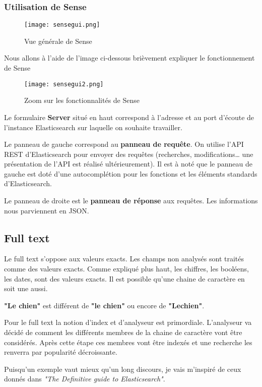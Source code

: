 \subsubsection{Utilisation de Sense}

\begin{figure}[H]
\center
\texttt{[image: sensegui.png]}
\label{fig:sensegui}
\caption{Vue générale de Sense}
\end{figure}

Nous allons à l'aide de l'image ci-dessous brièvement expliquer le fonctionnement de Sense
\begin{figure}[H]
\center
\texttt{[image: sensegui2.png]}
\label{fig:sensegui2.png}
\caption{Zoom sur les fonctionnalités de Sense}
\end{figure}
Le formulaire \textbf{Server} situé en haut correspond à l'adresse et au port d'écoute 
de l'instance Elasticsearch sur laquelle on souhaite travailler.

Le panneau de gauche correspond au \textbf{panneau de requête}. On utilise l'API 
REST d'Elasticsearch pour envoyer des requêtes (recherches, modifications\ldots 
une présentation de l'API est réalisé ultérieurement). Il est à noté que le panneau 
de gauche est doté d'une autocomplétion pour les fonctions et les éléments standards 
d'Elasticsearch.

Le panneau de droite est le \textbf{panneau de réponse} aux requêtes. Les informations
nous parviennent en JSON.

\subsection{Full text}
\label{subsec:elasticfulltext}
Le full text s'oppose aux valeurs exacts.
Les champs non analysés sont traités comme des valeurs exacts.
Comme expliqué plus haut, les chiffres, les booléens, les dates, sont des valeurs 
exacts. Il est possible qu'une chaine de caractère en soit une aussi.

\textbf{"Le chien"} est différent de \textbf{"le chien"} ou encore de \textbf{"Lechien"}.

Pour le full text la notion d'index et d'analyseur est primordiale. L'analyseur va
décidé de comment les différents membres de la chaine de caractère vont être considérés.
Après cette étape ces membres vont être indexés et une recherche les renverra par 
popularité décroissante.

Puisqu'un exemple vaut mieux qu'un long discours, je vais m'inspiré de ceux donnés
dans \textit{"The Definitive guide to Elasticsearch"}.


